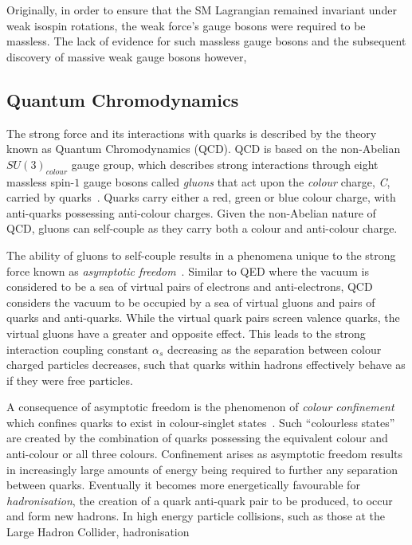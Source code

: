 Originally, in order to ensure that the SM Lagrangian remained invariant under weak isospin rotations, the weak force's gauge bosons were required to be massless.
The lack of evidence for such massless gauge bosons and the subsequent discovery of massive weak gauge bosons however, 

\subsection{Quantum Chromodynamics}\label{subsec:QCD}
The strong force and its interactions with quarks is described by the theory known as Quantum Chromodynamics (QCD).
QCD is based on the non-Abelian $SU(3)_{colour}$ gauge group, which describes strong interactions through eight massless spin-$1$ gauge bosons called \emph{gluons} that act upon the \emph{colour} charge, \emph{C}, carried by quarks~\cite{ElectroweakStrong}.
Quarks carry either a red, green or blue colour charge, with anti-quarks possessing anti-colour charges.
Given the non-Abelian nature of QCD, gluons can self-couple as they carry both a colour and anti-colour charge.

The ability of gluons to self-couple results in a phenomena unique to the strong force known as \emph{asymptotic freedom}~\cite{ElectroweakStrong,coughlan2006ideas,devenish2004deep}.
Similar to QED where the vacuum is considered to be a sea of virtual pairs of electrons and anti-electrons, QCD considers the vacuum to be occupied by a sea of virtual gluons and pairs of quarks and anti-quarks.
While the virtual quark pairs screen valence quarks, the virtual gluons have a greater and opposite effect. This leads to the strong interaction coupling constant $\alpha_{s}$ decreasing as the separation between colour charged particles decreases, such that quarks within hadrons effectively behave as if they were free particles.

A consequence of asymptotic freedom is the phenomenon of \emph{colour confinement} which confines quarks to exist in colour-singlet states~\cite{ElectroweakStrong,Griffiths,devenish2004deep}.
Such ``colourless states'' are created by the combination of quarks possessing the equivalent colour and anti-colour or all three colours.
Confinement arises as asymptotic freedom results in increasingly large amounts of energy being required to further any separation between quarks.
Eventually it becomes more energetically favourable for \emph{hadronisation}, the creation of a quark anti-quark pair to be produced, to occur and form new hadrons.
In high energy particle collisions, such as those at the Large Hadron Collider, hadronisation



